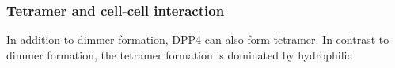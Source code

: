 \subsubsection{Tetramer and cell-cell interaction}

In addition to dimmer formation, DPP4 can also form tetramer. In contrast to dimmer formation, the tetramer formation is dominated by hydrophilic 